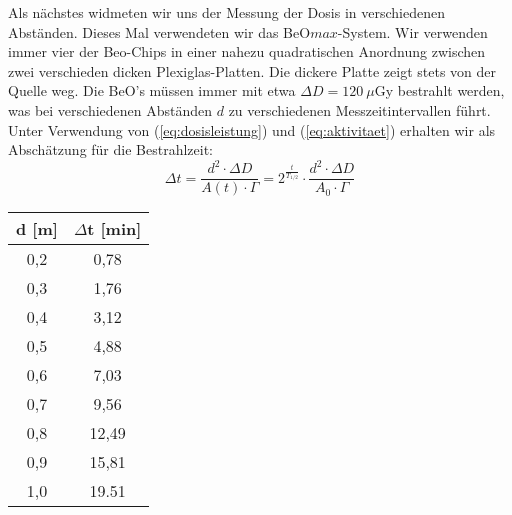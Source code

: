 Als nächstes widmeten wir uns der Messung der Dosis in verschiedenen Abständen. Dieses Mal verwendeten wir das BeO$max$-System. Wir verwenden immer vier der Beo-Chips in einer nahezu quadratischen Anordnung zwischen zwei verschieden dicken Plexiglas-Platten. Die dickere Platte zeigt stets von der Quelle weg.
Die BeO's müssen immer mit etwa $\Delta D = 120\ \mu$Gy bestrahlt werden, was bei verschiedenen Abständen $d$ zu verschiedenen Messzeitintervallen führt. Unter Verwendung von (\ref{eq:dosisleistung}) und (\ref{eq:aktivitaet}) erhalten wir als Abschätzung für die Bestrahlzeit:
\begin{equation}
		\Delta t 	= \frac{d^2 \cdot \Delta D}{A(t) \cdot \Gamma} 
					= 2^{\frac{t}{T_{1/2}}} \cdot \frac{d^2 \cdot \Delta D}{A_0 \cdot \Gamma} 
\end{equation}

\begin{table}
	\begin{center}
		\begin{tabular}{c|c}
				   \textbf{d} [m] & \textbf{$\Delta$t} [min] \\ 
		\hline     0,2 &  0,78 \\ 
				   0,3 &  1,76 \\ 
				   0,4 &  3,12 \\ 
				   0,5 &  4,88 \\ 
				   0,6 &  7,03 \\ 
				   0,7 &  9,56 \\ 
				   0,8 & 12,49 \\ 
				   0,9 & 15,81 \\ 
				   1,0 & 19.51 \\  
		\end{tabular} 
	\end{center}
\end{table}

